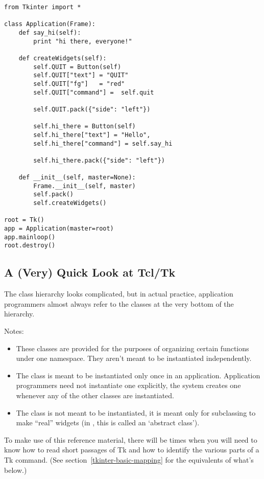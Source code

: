 \begin{verbatim}
from Tkinter import *

class Application(Frame):
    def say_hi(self):
        print "hi there, everyone!"

    def createWidgets(self):
        self.QUIT = Button(self)
        self.QUIT["text"] = "QUIT"
        self.QUIT["fg"]   = "red"
        self.QUIT["command"] =  self.quit

        self.QUIT.pack({"side": "left"})

        self.hi_there = Button(self)
        self.hi_there["text"] = "Hello",
        self.hi_there["command"] = self.say_hi

        self.hi_there.pack({"side": "left"})

    def __init__(self, master=None):
        Frame.__init__(self, master)
        self.pack()
        self.createWidgets()

root = Tk()
app = Application(master=root)
app.mainloop()
root.destroy()
\end{verbatim}


\subsection{A (Very) Quick Look at Tcl/Tk} %

The class hierarchy looks complicated, but in actual practice,
application programmers almost always refer to the classes at the very
bottom of the hierarchy. 

Notes:
\begin{itemize}
\item   These classes are provided for the purposes of
organizing certain functions under one namespace. They aren't meant to
be instantiated independently.

\item    The  class is meant to be instantiated only once in
an application. Application programmers need not instantiate one
explicitly, the system creates one whenever any of the other classes
are instantiated.

\item    The  class is not meant to be instantiated, it
is meant only for subclassing to make ``real'' widgets (in \Cpp, this
is called an `abstract class').
\end{itemize}

To make use of this reference material, there will be times when you
will need to know how to read short passages of Tk and how to identify
the various parts of a Tk command.  
(See section~\ref{tkinter-basic-mapping} for the
 equivalents of what's below.)

